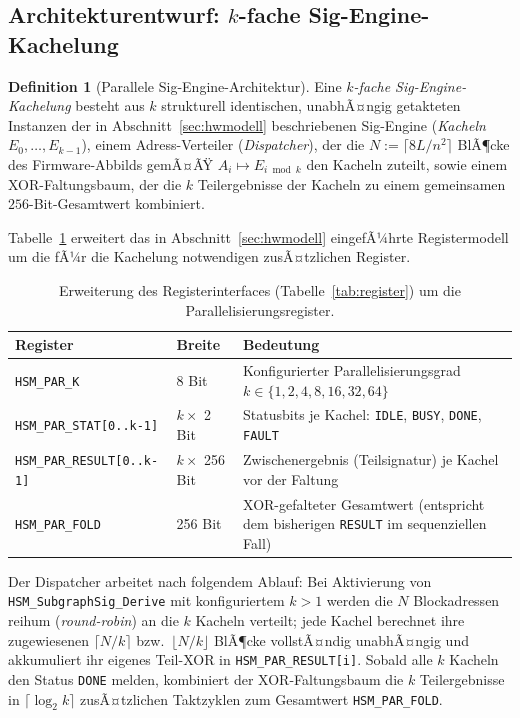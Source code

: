 ﻿\documentclass[a4paper,12pt]{article}
\theoremstyle{definition}
\newtheorem{definition}{Definition}
\begin{document}
\subsection{Architekturentwurf: $k$-fache Sig-Engine-Kachelung}
\label{subsec:par-architektur}

\begin{definition}[Parallele Sig-Engine-Architektur]
	\label{def:par-arch}
	Eine \emph{$k$-fache Sig-Engine-Kachelung} besteht aus $k$ strukturell identischen, unabhÃ¤ngig getakteten Instanzen der in Abschnitt~\ref{sec:hwmodell} beschriebenen Sig-Engine (\emph{Kacheln} $E_0,\ldots,E_{k-1}$), einem Adress-Verteiler (\emph{Dispatcher}), der die $N := \lceil 8L/n^2\rceil$ BlÃ¶cke des Firmware-Abbilds gemÃ¤ÃŸ $A_i \mapsto E_{i \bmod k}$ den Kacheln zuteilt, sowie einem XOR-Faltungsbaum, der die $k$ Teilergebnisse der Kacheln zu einem gemeinsamen $256$-Bit-Gesamtwert kombiniert.
\end{definition}

Tabelle~\ref{tab:par-register} erweitert das in Abschnitt~\ref{sec:hwmodell} eingefÃ¼hrte Registermodell um die fÃ¼r die Kachelung notwendigen zusÃ¤tzlichen Register.

\begin{table}[h]
	\centering
	\small
	\begin{tabular}{@{}lp{2.6cm}p{8.2cm}@{}}
		\toprule
		Register & Breite & Bedeutung \\
		\midrule
		\texttt{HSM\_PAR\_K} & 8 Bit & Konfigurierter Parallelisierungsgrad $k \in \{1,2,4,8,16,32,64\}$ \\
		\texttt{HSM\_PAR\_STAT[0..k-1]} & $k \times$ 2 Bit & Statusbits je Kachel: \texttt{IDLE}, \texttt{BUSY}, \texttt{DONE}, \texttt{FAULT} \\
		\texttt{HSM\_PAR\_RESULT[0..k-1]} & $k \times$ 256 Bit & Zwischenergebnis (Teilsignatur) je Kachel vor der Faltung \\
		\texttt{HSM\_PAR\_FOLD} & 256 Bit & XOR-gefalteter Gesamtwert (entspricht dem bisherigen \texttt{RESULT} im sequenziellen Fall) \\
		\bottomrule
	\end{tabular}
	\caption{Erweiterung des Registerinterfaces (Tabelle~\ref{tab:register}) um die Parallelisierungsregister.}
	\label{tab:par-register}
\end{table}

Der Dispatcher arbeitet nach folgendem Ablauf: Bei Aktivierung von \texttt{HSM\_SubgraphSig\_Derive} mit konfiguriertem $k > 1$ werden die $N$ Blockadressen reihum (\emph{round-robin}) an die $k$ Kacheln verteilt; jede Kachel berechnet ihre zugewiesenen $\lceil N/k \rceil$ bzw.\ $\lfloor N/k \rfloor$ BlÃ¶cke vollstÃ¤ndig unabhÃ¤ngig und akkumuliert ihr eigenes Teil-XOR in \texttt{HSM\_PAR\_RESULT[i]}. Sobald alle $k$ Kacheln den Status \texttt{DONE} melden, kombiniert der XOR-Faltungsbaum die $k$ Teilergebnisse in $\lceil \log_2 k \rceil$ zusÃ¤tzlichen Taktzyklen zum Gesamtwert \texttt{HSM\_PAR\_FOLD}.
\end{document}
